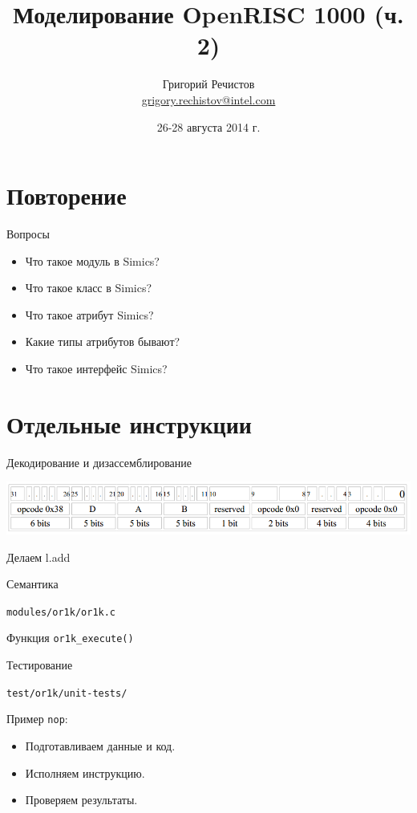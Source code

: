 \documentclass{beamer}
\title{Моделирование OpenRISC 1000 (ч. 2)}
\author[Григорий Речистов]{Григорий Речистов \\ \small{\href{mailto:grigory.rechistov@intel.com}{grigory.rechistov@intel.com}}}
\date{26-28 августа 2014 г.}
\begin{document}
\begin{frame}
\titlepage
\end{frame}

\begin{frame}
\tableofcontents
\end{frame} 

\section{Повторение}

\begin{frame}{Вопросы}
\pause
\begin{itemize}
	\item Что такое модуль в Simics? \pause
	\item Что такое класс в Simics? \pause
	\item Что такое атрибут Simics?\pause
	\item Какие типы атрибутов бывают?\pause
	\item Что такое интерфейс Simics?

\end{itemize}

\end{frame}

\section{Отдельные инструкции}

\begin{frame}{Декодирование и дизассемблирование}

\includegraphics[width=\textwidth]{openrisc-format}

Делаем l.add

\end{frame}

\begin{frame}{Семантика}

\texttt{modules/or1k/or1k.c}

Функция \texttt{or1k_execute()}

\end{frame}


\begin{frame}{Тестирование}

\texttt{test/or1k/unit-tests/}

Пример \texttt{nop}:

\begin{itemize}
\item Подготавливаем данные и код.
\item Исполняем инструкцию.
\item Проверяем результаты.
\end{itemize}

\end{frame}
\end{document}
